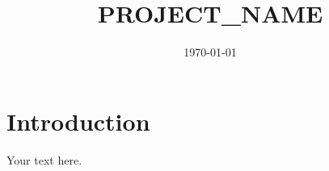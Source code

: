 \documentclass[11pt]{article}
\title{PROJECT_NAME}
\author{}
\date{\today}
\begin{document}
\maketitle

\section{Introduction}

Your text here.
\end{document}
